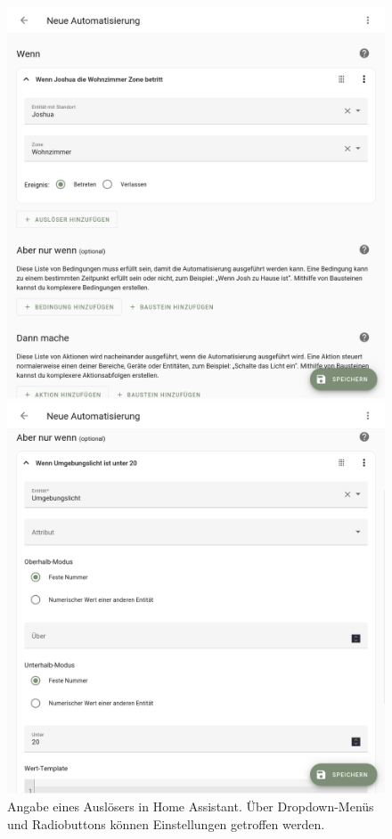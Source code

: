\begin{figure}[!ht]
  \begin{minipage}[t]{\hascwidth}
    \includegraphics[width=\linewidth]{assets/hassio-automation-trigger.png}
    \caption[Angabe eines Auslösers in Home Assistant]{Angabe eines Auslösers in Home Assistant. Über Dropdown-Menüs und Radiobuttons können Einstellungen getroffen werden.}
    \label{fig:hassio-automation-trigger}
  \end{minipage}
  \hfill
  \begin{minipage}[t]{\hascwidth}
    \includegraphics[width=\linewidth]{assets/hassio-automation-condition.png}

\end{minipage}
\end{figure}
